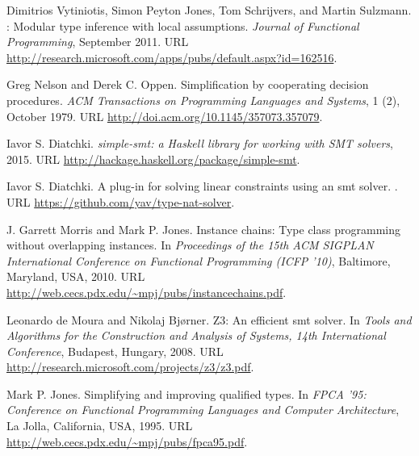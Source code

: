 \documentclass{sigplanconf}
\begin{document}
\begin{thebibliography}{}
{Dimitrios Vytiniotis}, {Simon Peyton Jones}, {Tom Schrijvers}, and {Martin
  Sulzmann}.
: Modular type inference with local assumptions.
\newblock \emph{Journal of Functional Programming}, September 2011.
\newblock URL
  \url{http://research.microsoft.com/apps/pubs/default.aspx?id=162516}.

{Greg Nelson} and {Derek C. Oppen}.
\newblock Simplification by cooperating decision procedures.
\newblock \emph{ACM Transactions on Programming Languages and Systems},
  1 (2), October 1979.
\newblock URL \url{http://doi.acm.org/10.1145/357073.357079}.

{Iavor S. Diatchki}.
\newblock \emph{simple-smt: a {Haskell} library for working with SMT solvers},
  2015{}.
\newblock URL \url{http://hackage.haskell.org/package/simple-smt}.

{Iavor S. Diatchki}.
\newblock A plug-in for solving linear constraints using an smt solver.
.
\newblock URL \url{https://github.com/yav/type-nat-solver}.

{J. Garrett Morris} and {Mark P. Jones}.
\newblock Instance chains: Type class programming without overlapping
  instances.
\newblock In \emph{Proceedings of the 15th ACM SIGPLAN International Conference
  on Functional Programming (ICFP '10)}, Baltimore, Maryland, USA, 2010.
\newblock URL \url{http://web.cecs.pdx.edu/~mpj/pubs/instancechains.pdf}.

{Leonardo de Moura} and {Nikolaj Bjørner}.
\newblock Z3: An efficient smt solver.
\newblock In \emph{Tools and Algorithms for the Construction and Analysis of
  Systems, 14th International Conference}, Budapest, Hungary, 2008.
\newblock URL \url{http://research.microsoft.com/projects/z3/z3.pdf}.

{Mark P. Jones}.
\newblock Simplifying and improving qualified types.
\newblock In \emph{FPCA '95: Conference on Functional Programming Languages and
  Computer Architecture}, La Jolla, California, USA, 1995.
\newblock URL \url{http://web.cecs.pdx.edu/~mpj/pubs/fpca95.pdf}.


\end{thebibliography}
\end{document}

